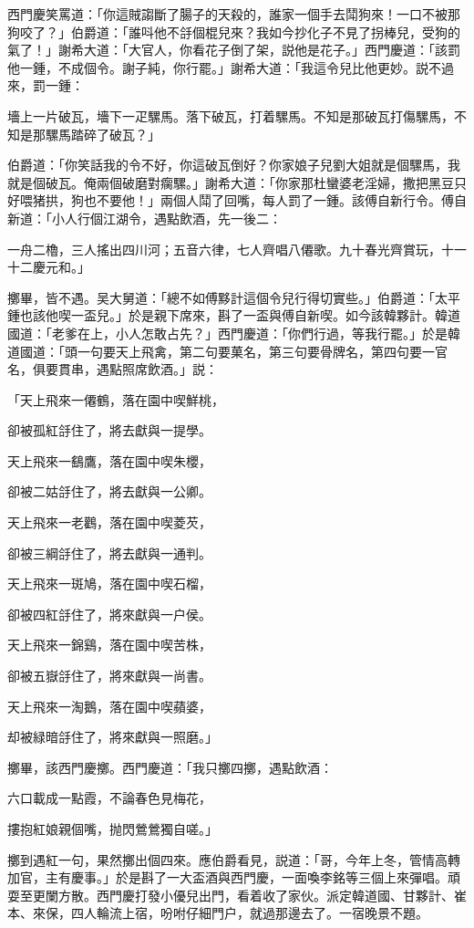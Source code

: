 西門慶笑罵道：「你這賊謅斷了腸子的天殺的，誰家一個手去鬦狗來！一口不被那狗咬了？」伯爵道：「誰呌他不㧱個棍兒來？我如今抄化子不見了拐棒兒，受狗的氣了！」謝希大道：「大官人，你看花子倒了架，説他是花子。」西門慶道：「該罰他一鍾，不成個令。謝子純，你行罷。」謝希大道：「我這令兒比他更妙。説不過來，罰一鍾：

墻上一片破瓦，墻下一疋騾馬。落下破瓦，打着騾馬。不知是那破瓦打傷騾馬，不知是那騾馬踏碎了破瓦？」

伯爵道：「你笑話我的令不好，你這破瓦倒好？你家娘子兒劉大姐就是個騾馬，我就是個破瓦。俺兩個破磨對瘸騾。」謝希大道：「你家那杜蠻婆老淫婦，撒把黑豆只好喂猪拱，狗也不要他！」兩個人鬦了回嘴，每人罰了一鍾。該傅自新行令。傅自新道：「小人行個江湖令，遇點飲酒，先一後二：

一舟二櫓，三人搖出四川河；五音六律，七人齊唱八僊歌。九十春光齊賞玩，十一十二慶元和。」

擲畢，皆不遇。吴大舅道：「總不如傅黟計這個令兒行得切實些。」伯爵道：「太平鍾也該他喫一盃兒。」於是親下席來，斟了一盃與傅自新喫。如今該韓夥計。韓道國道：「老爹在上，小人怎敢占先？」西門慶道：「你們行過，等我行罷。」於是韓道國道：「頭一句要天上飛禽，第二句要菓名，第三句要骨牌名，第四句要一官名，俱要貫串，遇點照席飲酒。」説：

「天上飛來一僊鶴，落在園中喫鮮桃，

卻被孤紅㧱住了，將去獻與一提學。

天上飛來一鷂鷹，落在園中喫朱櫻，

卻被二姑㧱住了，將去獻與一公卿。

天上飛來一老鸛，落在園中喫菱芡，

卻被三綱㧱住了，將去獻與一通判。

天上飛來一斑鳩，落在園中喫石榴，

卻被四紅㧱住了，將來獻與一户侯。

天上飛來一錦鷄，落在園中喫苦株，

卻被五嶽㧱住了，將來獻與一尚書。

天上飛來一淘鵝，落在園中喫蘋婆，

却被緑暗㧱住了，將來獻與一照磨。」

擲畢，該西門慶擲。西門慶道：「我只擲四擲，遇點飲酒：

六口載成一點霞，不論春色見梅花，

摟抱紅娘親個嘴，抛閃鶯鶯獨自嗟。」

擲到遇紅一句，果然擲出個四來。應伯爵看見，説道：「哥，今年上冬，管情高轉加官，主有慶事。」於是斟了一大盃酒與西門慶，一面喚李銘等三個上來彈唱。頑耍至更闌方散。西門慶打發小優兒出門，看着收了家伙。派定韓道國、甘夥計、崔本、來保，四人輪流上宿，吩咐仔細門户，就過那邊去了。一宿晚景不題。

